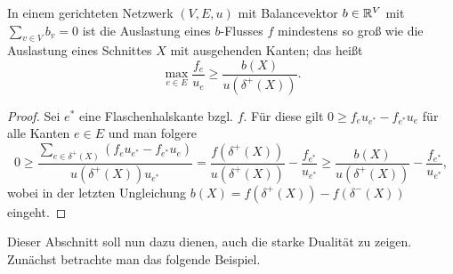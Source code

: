 \begin{theorem}\label{thm-weak-duality-min-con-flow}
 	In einem gerichteten Netzwerk $(V, E, u)$ mit Balancevektor $b\in\mathbb{R}^V$ mit $\sum_{v\in V}b_v = 0$ ist die Auslastung eines $b$-Flusses $f$ mindestens so groß wie die Auslastung eines Schnittes $X$ mit ausgehenden Kanten; das heißt \[\max_{e\in E} \frac{f_e}{u_e} \geq \frac{b(X)}{u(\delta^+(X))}.\]
\end{theorem}
\begin{proof}
	Sei $e^*$ eine Flaschenhalskante bzgl. $f$.
	Für diese gilt $0\geq f_e u_{e^*} - f_{e^*}u_e$ für alle Kanten $e\in E$ und man folgere
	\[
	0\geq \frac{\sum_{e\in \delta^+(X)}(f_e u_{e^*} - f_{e^*}u_e)}{u(\delta^+(X)) u_{e^*}} = \frac{f(\delta^+(X))}{u(\delta^+(X))} - \frac{f_{e^*}}{u_{e^*}} \geq \frac{b(X)}{u(\delta^+(X))} - \frac{f_{e^*}}{u_{e^*}},
	\]
	wobei in der letzten Ungleichung $b(X) = f(\delta^+(X)) - f(\delta^-(X))$ eingeht.
\end{proof}

Dieser Abschnitt soll nun dazu dienen, auch die starke Dualität zu zeigen.
Zunächst betrachte man das folgende Beispiel.

